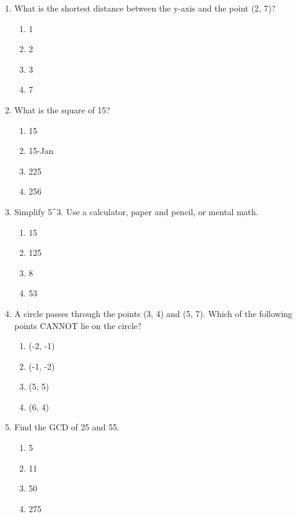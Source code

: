 \documentclass[12pt]{article}
\begin{document}
\begin{enumerate}[label=\arabic*.]
\begin{enumerate}[label=(\alph*)]
    \item 5
    \item 10
    \item 15
    \item 20
\end{enumerate}
\item What is the shortest distance between the y-axis and the point (2, 7)?
\begin{enumerate}[label=(\alph*)]
    \item 1
    \item 2
    \item 3
    \item 7
\end{enumerate}
\item What is the square of 15?
\begin{enumerate}[label=(\alph*)]
    \item 15
    \item 15-Jan
    \item 225
    \item 256
\end{enumerate}
\item Simplify 5\^{}3. Use a calculator, paper and pencil, or mental math.
\begin{enumerate}[label=(\alph*)]
    \item 15
    \item 125
    \item 8
    \item 53
\end{enumerate}
\item A circle passes through the points (3, 4) and (5, 7). Which of the following points CANNOT lie on the circle?
\begin{enumerate}[label=(\alph*)]
    \item (-2, -1)
    \item (-1, -2)
    \item (5, 5)
    \item (6, 4)
\end{enumerate}
\item Find the GCD of 25 and 55.
\begin{enumerate}[label=(\alph*)]
    \item 5
    \item 11
    \item 50
    \item 275
\end{enumerate}
\end{enumerate}
\end{document}
